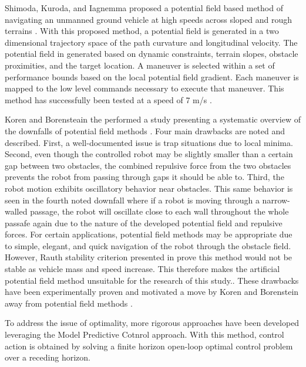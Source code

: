 \documentclass[12pt,onecolumn]{report}
\begin{document}
Shimoda, Kuroda, and Iagnemma proposed a potential field based method of navigating an unmanned ground vehicle at high speeds across sloped and rough terrains \cite{Shimoda&Kuroda&Iagnemma2007}. With this proposed method, a potential field is generated in a two dimensional trajectory space of the path curvature and longitudinal velocity. The potential field in generated based on dynamic constraints, terrain slopes, obstacle proximities, and the target location. A maneuver is selected within a set of performance bounds based on the local potential field gradient. Each maneuver is mapped to the low level commands necessary to execute that maneuver. This method has successfully been tested at a speed of 7 m/s \cite{Shimoda&Kuroda&Iagnemma2007}.

Koren and Borensteain the performed a study presenting a systematic overview of the downfalls of potential field methods \cite{Koren&Borenstein1991}. Four main drawbacks are noted and described. First, a well-documented issue is trap situations due to local minima. Second, even though the controlled robot may be slightly smaller than a certain gap between two obstacles, the combined repulsive force from the two obstacles prevents the robot from passing through gaps it should be able to. Third, the robot motion exhibits oscillatory behavior near obstacles. This same behavior is seen in the fourth noted downfall where if a robot is moving through a narrow-walled passage, the robot will oscillate close to each wall throughout the whole passafe again due to the nature of the developed potential field and repulsive forces. For certain applications, potential field methods may be appropriate due to simple, elegant, and quick navigation of the robot through the obstacle field. However, Rauth stability criterion presented in \cite{Koren&Borenstein1991} prove this method would not be stable as vehicle mass and speed increase. This therefore makes the artificial potential field method unsuitable for the research of this study.. These drawbacks have been experimentally proven and motivated a move by Koren and Borenstein away from potential field methods \cite{Koren&Borenstein1991}.

To address the issue of optimality, more rigorous approaches have been developed leveraging the Model Predictive Cotnrol approach. With this method, control action is obtained by solving a finite horizon open-loop optimal control problem over a receding horizon.
\end{document}
